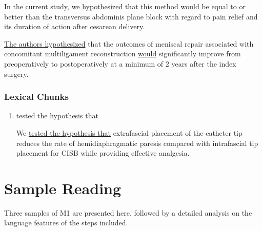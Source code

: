 \documentclass[a4paper]{ctexbook}
\begin{document}
    \begin{eg}{}
      In the current study, \uline{we hypothesized} that this method \uline{would} be equal to or better than the transversus abdominis plane block with regard to pain relief and its duration of action after cesarean delivery.
    \end{eg}

    \begin{eg}{}
      \uline{The authors hypothesized} that the outcomes of meniscal repair associated with concomitant multiligament reconstruction \uline{would} significantly improve from preoperatively to postoperatively at a minimum of 2 years after the index surgery.
    \end{eg}


    \subsubsection{Lexical Chunks}

    \begin{enumerate}
      \item tested the hypothesis that
      \begin{eg}
        We \uline{tested the hypothesis that} extrafascial placement of the catheter tip reduces the rate of hemidiaphragmatic paresis compared with intrafascial tip placement for CISB while providing effective analgesia.
      \end{eg}
    \end{enumerate}

\section{Sample Reading}

Three samples of M1 are presented here, followed by a detailed analysis on the language features of the steps included.
\end{document}
